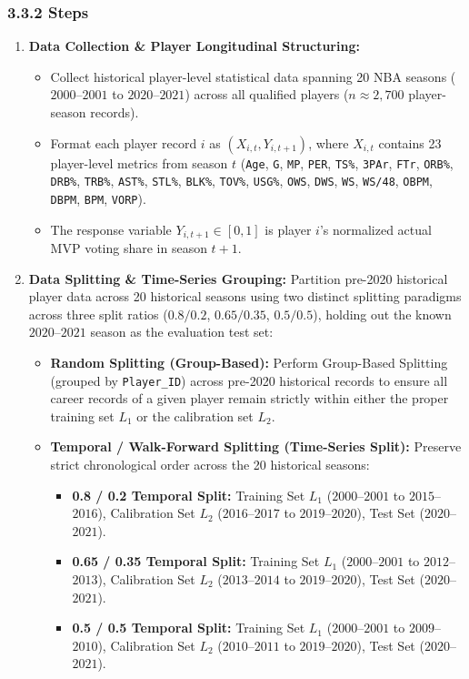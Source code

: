 \documentclass[11pt,a4paper]{article}
\begin{document}
\subsubsection{3.3.2 Steps}
\begin{enumerate}
    \item \textbf{Data Collection \& Player Longitudinal Structuring:}
    \begin{itemize}
        \item Collect historical player-level statistical data spanning 20 NBA seasons ($2000$--$2001$ to $2020$--$2021$) across all qualified players ($n \approx 2,700$ player-season records).
        \item Format each player record $i$ as $(X_{i,t}, Y_{i,t+1})$, where $X_{i,t}$ contains 23 player-level metrics from season $t$ (\texttt{Age}, \texttt{G}, \texttt{MP}, \texttt{PER}, \texttt{TS\%}, \texttt{3PAr}, \texttt{FTr}, \texttt{ORB\%}, \texttt{DRB\%}, \texttt{TRB\%}, \texttt{AST\%}, \texttt{STL\%}, \texttt{BLK\%}, \texttt{TOV\%}, \texttt{USG\%}, \texttt{OWS}, \texttt{DWS}, \texttt{WS}, \texttt{WS/48}, \texttt{OBPM}, \texttt{DBPM}, \texttt{BPM}, \texttt{VORP}).
        \item The response variable $Y_{i,t+1} \in [0, 1]$ is player $i$'s normalized actual MVP voting share in season $t+1$.
    \end{itemize}

    \item \textbf{Data Splitting \& Time-Series Grouping:}
    Partition pre-2020 historical player data across 20 historical seasons using two distinct splitting paradigms across three split ratios ($0.8/0.2$, $0.65/0.35$, $0.5/0.5$), holding out the known $2020$--$2021$ season as the evaluation test set:
    \begin{itemize}
        \item \textbf{Random Splitting (Group-Based):} Perform Group-Based Splitting (grouped by \texttt{Player\_ID}) across pre-2020 historical records to ensure all career records of a given player remain strictly within either the proper training set $L_1$ or the calibration set $L_2$.
        \item \textbf{Temporal / Walk-Forward Splitting (Time-Series Split):} Preserve strict chronological order across the 20 historical seasons:
        \begin{itemize}
            \item \textbf{0.8 / 0.2 Temporal Split:} Training Set $L_1$ ($2000$--$2001$ to $2015$--$2016$), Calibration Set $L_2$ ($2016$--$2017$ to $2019$--$2020$), Test Set ($2020$--$2021$).
            \item \textbf{0.65 / 0.35 Temporal Split:} Training Set $L_1$ ($2000$--$2001$ to $2012$--$2013$), Calibration Set $L_2$ ($2013$--$2014$ to $2019$--$2020$), Test Set ($2020$--$2021$).
            \item \textbf{0.5 / 0.5 Temporal Split:} Training Set $L_1$ ($2000$--$2001$ to $2009$--$2010$), Calibration Set $L_2$ ($2010$--$2011$ to $2019$--$2020$), Test Set ($2020$--$2021$).
        \end{itemize}
    \end{itemize}


\end{enumerate}
\end{document}
